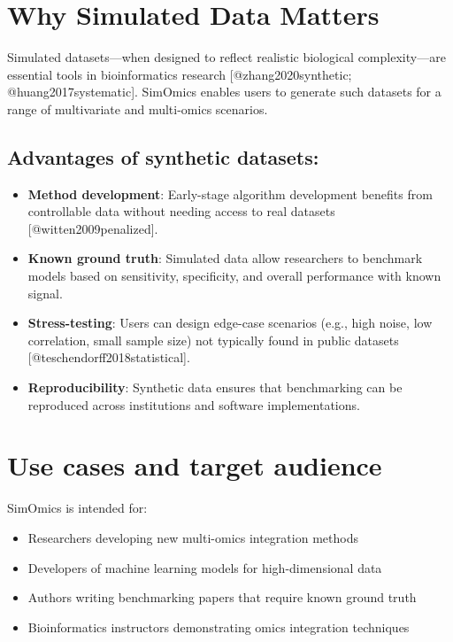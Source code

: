 \section{Why Simulated Data Matters}\label{why-simulated-data-matters}

Simulated datasets---when designed to reflect realistic biological
complexity---are essential tools in bioinformatics research
{[}@zhang2020synthetic; @huang2017systematic{]}. SimOmics enables users
to generate such datasets for a range of multivariate and multi-omics
scenarios.

\subsection{Advantages of synthetic
datasets:}\label{advantages-of-synthetic-datasets}

\begin{itemize}
\tightlist
\item
  \textbf{Method development}: Early-stage algorithm development
  benefits from controllable data without needing access to real
  datasets {[}@witten2009penalized{]}.
\item
  \textbf{Known ground truth}: Simulated data allow researchers to
  benchmark models based on sensitivity, specificity, and overall
  performance with known signal.
\item
  \textbf{Stress-testing}: Users can design edge-case scenarios (e.g.,
  high noise, low correlation, small sample size) not typically found in
  public datasets {[}@teschendorff2018statistical{]}.
\item
  \textbf{Reproducibility}: Synthetic data ensures that benchmarking can
  be reproduced across institutions and software implementations.
\end{itemize}

\section{Use cases and target
audience}\label{use-cases-and-target-audience}

SimOmics is intended for:

\begin{itemize}
\tightlist
\item
  Researchers developing new multi-omics integration methods
\item
  Developers of machine learning models for high-dimensional data
\item
  Authors writing benchmarking papers that require known ground truth
\item
  Bioinformatics instructors demonstrating omics integration techniques
\end{itemize}

